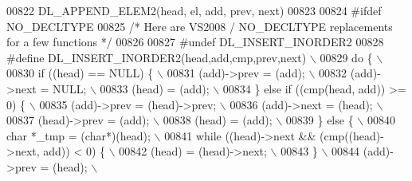 \begin{DoxyCode}
00822 \textcolor{preprocessor}{   DL\_APPEND\_ELEM2(head, el, add, prev, next)}
00823 
00824 \textcolor{preprocessor}{#ifdef NO\_DECLTYPE}
00825 \textcolor{comment}{/* Here are VS2008 / NO\_DECLTYPE replacements for a few functions */}
00826 
00827 \textcolor{preprocessor}{#undef DL\_INSERT\_INORDER2}
00828 \textcolor{preprocessor}{#define DL\_INSERT\_INORDER2(head,add,cmp,prev,next)                                             \(\backslash\)}
00829 \textcolor{preprocessor}{do \{                                                                                           \(\backslash\)}
00830 \textcolor{preprocessor}{  if ((head) == NULL) \{                                                                        \(\backslash\)}
00831 \textcolor{preprocessor}{    (add)->prev = (add);                                                                       \(\backslash\)}
00832 \textcolor{preprocessor}{    (add)->next = NULL;                                                                        \(\backslash\)}
00833 \textcolor{preprocessor}{    (head) = (add);                                                                            \(\backslash\)}
00834 \textcolor{preprocessor}{  \} else if ((cmp(head, add)) >= 0) \{                                                          \(\backslash\)}
00835 \textcolor{preprocessor}{    (add)->prev = (head)->prev;                                                                \(\backslash\)}
00836 \textcolor{preprocessor}{    (add)->next = (head);                                                                      \(\backslash\)}
00837 \textcolor{preprocessor}{    (head)->prev = (add);                                                                      \(\backslash\)}
00838 \textcolor{preprocessor}{    (head) = (add);                                                                            \(\backslash\)}
00839 \textcolor{preprocessor}{  \} else \{                                                                                     \(\backslash\)}
00840 \textcolor{preprocessor}{    char *\_tmp = (char*)(head);                                                                \(\backslash\)}
00841 \textcolor{preprocessor}{    while ((head)->next && (cmp((head)->next, add)) < 0) \{                                     \(\backslash\)}
00842 \textcolor{preprocessor}{      (head) = (head)->next;                                                                   \(\backslash\)}
00843 \textcolor{preprocessor}{    \}                                                                                          \(\backslash\)}
00844 \textcolor{preprocessor}{    (add)->prev = (head);                                                                      \(\backslash\)}

\end{DoxyCode}
